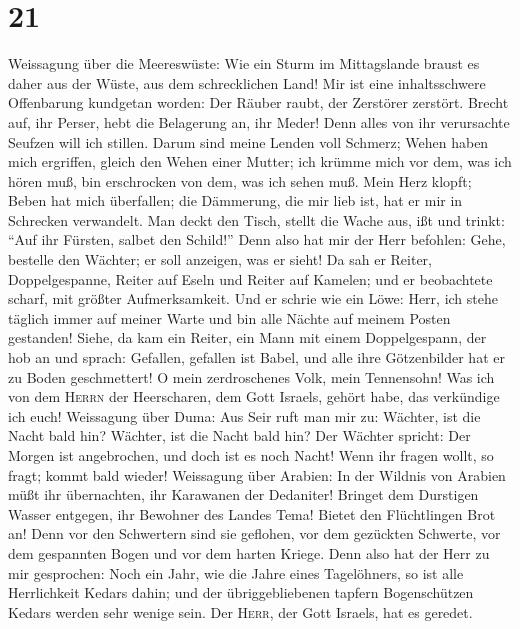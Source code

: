 \hypertarget{section-20}{%
\section{21}\label{section-20}}

 Weissagung über die Meereswüste: Wie ein Sturm im
Mittagslande braust es daher aus der Wüste, aus dem schrecklichen Land!
 Mir ist eine inhaltsschwere Offenbarung kundgetan worden:
Der Räuber raubt, der Zerstörer zerstört. Brecht auf, ihr Perser, hebt
die Belagerung an, ihr Meder! Denn alles von ihr verursachte Seufzen
will ich stillen.  Darum sind meine Lenden voll Schmerz;
Wehen haben mich ergriffen, gleich den Wehen einer Mutter; ich krümme
mich vor dem, was ich hören muß, bin erschrocken von dem, was ich sehen
muß.  Mein Herz klopft; Beben hat mich überfallen; die
Dämmerung, die mir lieb ist, hat er mir in Schrecken verwandelt.
 Man deckt den Tisch, stellt die Wache aus, ißt und
trinkt: ``Auf ihr Fürsten, salbet den Schild!''  Denn also
hat mir der Herr befohlen: Gehe, bestelle den Wächter; er soll anzeigen,
was er sieht!  Da sah er Reiter, Doppelgespanne, Reiter
auf Eseln und Reiter auf Kamelen; und er beobachtete scharf, mit größter
Aufmerksamkeit.  Und er schrie wie ein Löwe: Herr, ich
stehe täglich immer auf meiner Warte und bin alle Nächte auf meinem
Posten gestanden!  Siehe, da kam ein Reiter, ein Mann mit
einem Doppelgespann, der hob an und sprach: Gefallen, gefallen ist
Babel, und alle ihre Götzenbilder hat er zu Boden geschmettert!
 O mein zerdroschenes Volk, mein Tennensohn! Was ich von
dem \textsc{Herrn} der Heerscharen, dem Gott Israels, gehört habe, das
verkündige ich euch!  Weissagung über Duma: Aus Seir ruft
man mir zu: Wächter, ist die Nacht bald hin? Wächter, ist die Nacht bald
hin?  Der Wächter spricht: Der Morgen ist angebrochen,
und doch ist es noch Nacht! Wenn ihr fragen wollt, so fragt; kommt bald
wieder!  Weissagung über Arabien: In der Wildnis von
Arabien müßt ihr übernachten, ihr Karawanen der Dedaniter!
 Bringet dem Durstigen Wasser entgegen, ihr Bewohner des
Landes Tema! Bietet den Flüchtlingen Brot an!  Denn vor
den Schwertern sind sie geflohen, vor dem gezückten Schwerte, vor dem
gespannten Bogen und vor dem harten Kriege.  Denn also
hat der Herr zu mir gesprochen: Noch ein Jahr, wie die Jahre eines
Tagelöhners, so ist alle Herrlichkeit Kedars dahin;  und
der übriggebliebenen tapfern Bogenschützen Kedars werden sehr wenige
sein. Der \textsc{Herr}, der Gott Israels, hat es geredet.


